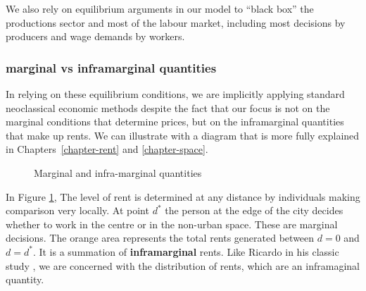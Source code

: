 
We also rely on equilibrium arguments in our model to ``black box'' the productions sector and most of  the labour market, including most decisions by producers and wage demands by workers. 



\subsubsection{\Gls{marginal} vs \gls{inframarginal} quantities}

In relying on these equilibrium conditions, we are implicitly applying standard neoclassical economic methods despite the fact that our focus is not on the \gls{marginal} conditions that determine prices, but on the \gls{inframarginal} quantities that make up rents. We can illustrate with a diagram that is more fully explained in Chapters~\ref{chapter-rent} and \ref{chapter-space}. 

\begin{figure}[hb]
    \centering
  
   \caption{Marginal and infra-marginal quantities}
    \label{fig:landrentasinframarginal}
\end{figure}
In Figure \ref{fig:landrentasinframarginal}, The level of rent is determined at any distance by individuals making comparison very locally. At point $d^*$ the person at the edge of the city decides whether to work in the centre or in the non-urban space. These are \gls{marginal} decisions. The orange area represents  the total rents generated between $d=0$ and $d=d^*$. It is a summation of \textbf{\gls{inframarginal}} rents. Like Ricardo in his classic study \cite{ricardoEssayInfluenceLow1815}, we are concerned with the distribution of rents, which are an  inframaginal quantity.


